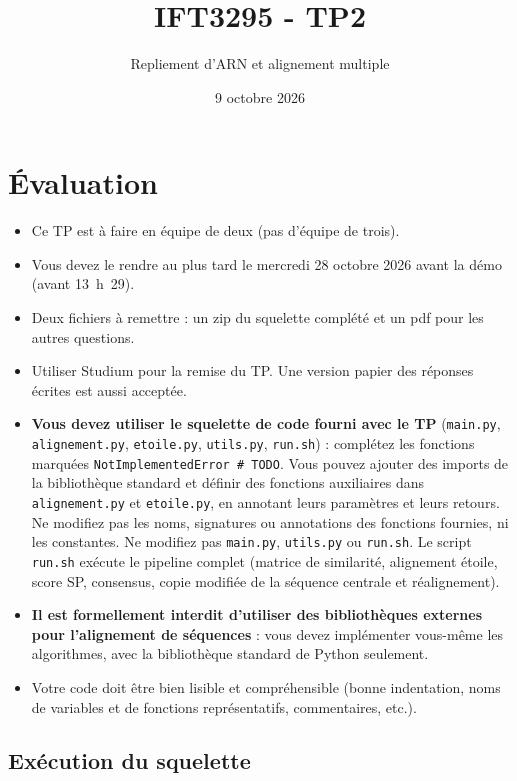 \documentclass[12pt]{article}
\title{IFT3295 - TP2}
\author{Repliement d'ARN et alignement multiple}
\date{9 octobre 2026}
\begin{document}
\maketitle
\section*{Évaluation}
\begin{itemize}
	\item Ce TP est à faire en équipe de deux (pas d'équipe de trois).
	\item Vous devez le rendre au plus tard le
	      mercredi 28 octobre 2026 avant la démo (avant 13~h~29).
	\item Deux fichiers à remettre : un zip du squelette complété et un pdf
	      pour les autres questions.
	\item Utiliser Studium pour la remise du TP. Une version papier des réponses écrites est aussi
	      acceptée.
	\item \textbf{Vous devez utiliser le squelette de code fourni avec le TP}
	      (\texttt{main.py}, \texttt{alignement.py}, \texttt{etoile.py}, \texttt{utils.py},
	      \texttt{run.sh}) : complétez les fonctions marquées
	      \texttt{NotImplementedError \# TODO}. Vous pouvez ajouter des imports
	      de la bibliothèque standard et définir des fonctions auxiliaires dans
	      \texttt{alignement.py} et \texttt{etoile.py}, en annotant leurs paramètres
	      et leurs retours. Ne modifiez pas les noms, signatures ou annotations
	      des fonctions fournies, ni les constantes. Ne modifiez pas
	      \texttt{main.py}, \texttt{utils.py} ou \texttt{run.sh}.
	      Le script \texttt{run.sh} exécute le
	      pipeline complet (matrice de similarité, alignement étoile, score SP,
	      consensus, copie modifiée de la séquence centrale et réalignement).
	\item \textbf{Il est formellement interdit d'utiliser des bibliothèques
	      externes pour l'alignement de séquences} :
	      vous devez implémenter vous-même les algorithmes, avec la bibliothèque
	      standard de Python seulement.
	\item Votre code doit être bien lisible et compréhensible (bonne
	      indentation, noms de variables et de fonctions représentatifs, commentaires,
	      etc.).
\end{itemize}

\subsection*{Exécution du squelette}
\end{document}

